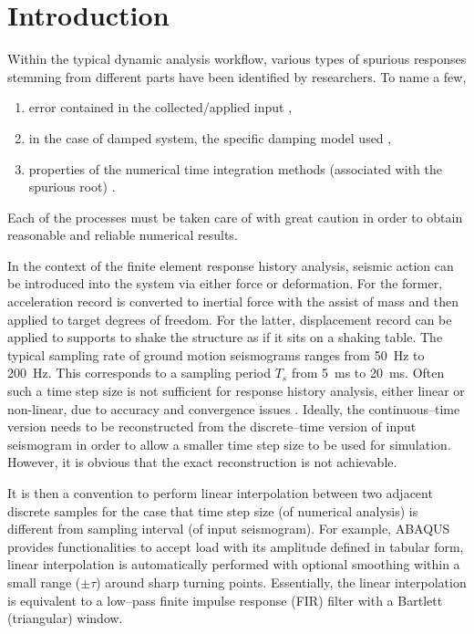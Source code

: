 \section{Introduction}
Within the typical dynamic analysis workflow, various types of spurious responses stemming from different parts have been identified by researchers. To name a few,
\begin{enumerate}
\item error contained in the collected/applied input \citep{Shing1987},
\item in the case of damped system, the specific damping model used \citep{Hall2006,Jehel2014,Chopra2015},
\item properties of the numerical time integration methods (associated with the spurious root) \citep{Hulbert1994}.
\end{enumerate}
Each of the processes must be taken care of with great caution in order to obtain reasonable and reliable numerical results.

In the context of the finite element response history analysis, seismic action can be introduced into the system via either force or deformation. For the former, acceleration record is converted to inertial force with the assist of mass and then applied to target degrees of freedom. For the latter, displacement record can be applied to supports to shake the structure as if it sits on a shaking table.
The typical sampling rate of ground motion seismograms ranges from \SI{50}{\hertz} to \SI{200}{\hertz}. This corresponds to a sampling period $T_s$ from \SI{5}{\milli\second} to \SI{20}{\milli\second}. Often such a time step size is not sufficient for response history analysis, either linear or non-linear, due to accuracy and convergence issues \citep[see, e.g.,][]{Chang2011,Rossi2014}. Ideally, the continuous--time version needs to be reconstructed from the discrete--time version of input seismogram in order to allow a smaller time step size to be used for simulation. However, it is obvious that the exact reconstruction is not achievable.

It is then a convention to perform linear interpolation between two adjacent discrete samples for the case that time step size (of numerical analysis) is different from sampling interval (of input seismogram). For example, ABAQUS \citep[see][\S34.1.2]{ABAQUS2014} provides functionalities to accept load with its amplitude defined in tabular form, linear interpolation is automatically performed with optional smoothing within a small range ($\pm\tau$) around sharp turning points. Essentially, the linear interpolation is equivalent to a low--pass finite impulse response (FIR) filter with a Bartlett (triangular) window.

